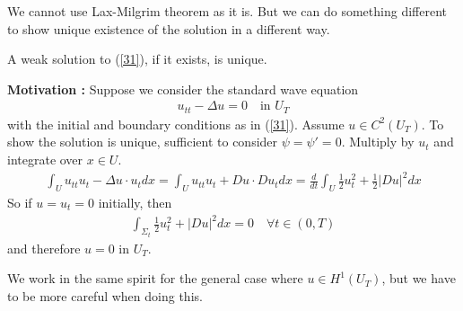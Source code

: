 \documentclass[12pt,a4paper]{report}
\begin{document}
We cannot use Lax-Milgrim theorem as it is. But we can do something different to show unique existence of the solution in a different way.
\s

\thm A weak solution to (\ref{31}), if it exists, is unique.
\s

\textbf{Motivation :} Suppose we consider the standard wave equation
\begin{align*}
u_{tt}  - \Delta u = 0 \quad \text{in } U_T
\end{align*}
with the initial and boundary conditions as in (\ref{31}). Assume $u\in C^2(U_T)$. To show the solution is unique, sufficient to consider $\psi= \psi' =0$. Multiply by $u_t$ and integrate over $x\in U$.
\begin{align*}
\int_U u_{tt} u_t - \Delta u \cdot u_t dx =  \int_U u_{tt} u_t + Du \cdot Du_t dx = \frac{d}{dt} \int_U \frac{1}{2} u_t^2 + \frac{1}{2} |Du|^2 dx
\end{align*}
So if $u=u_t =0$ initially, then 
\begin{align*}
\int_{\Sigma_t} \frac{1}{2} u_t^2 + |Du|^2 dx =0 \quad \forall t\in (0,T)
\end{align*}
and therefore $u=0$ in $U_T$.

\quad We work in the same spirit for the general case where $u \in H^1(U_T)$, but we have to be more careful when doing this.
\s
\end{document}
